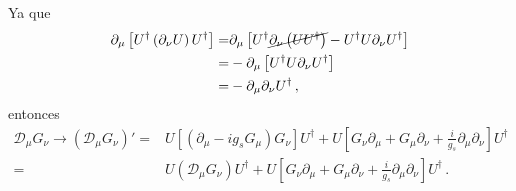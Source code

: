 Ya que
\begin{align}
 \partial_{\mu} \left[ {U}^{\dagger}
    \left( \partial_{\nu}{U} \right) {U}^{\dagger}\right]=&
 \partial_{\mu} \left[ {U}^{\dagger}
    \cancel{\partial_{\nu}\left( {U} {U}^{\dagger}\right)} -{U}^{\dagger}{U} \partial_{\nu} {U}^{\dagger}\right] \nonumber\\
=&- \partial_{\mu} \left[ {U}^{\dagger} {U} \partial_{\nu} {U}^{\dagger}\right] \nonumber\\
=&- \partial_{\mu}  \partial_{\nu} {U}^{\dagger} \,,
\end{align}
entonces
\begin{align}
\label{eq:Dmup}
\mathcal{D}_{\mu} {G}_{\nu}\to   \left(   \mathcal{D}_{\mu} {G}_{\nu} \right)' =& {U} \left[ \left( \partial_{\mu}-ig_s {G}_{\mu} \right){G}_\nu   \right]{U}^{\dagger}
    + {U} \left[ {G}_{\nu} \partial_{\mu}+{G}_{\mu}\partial_{\nu}+\frac{i}{g_s} \partial_{\mu}\partial_{\nu} \right] {U}^{\dagger} \nonumber\\
 =& {U} \left( \mathcal{D}_{\mu}{G}_\nu   \right){U}^{\dagger}
    + {U} \left[ {G}_{\nu} \partial_{\mu}+{G}_{\mu}\partial_{\nu}+\frac{i}{g_s} \partial_{\mu}\partial_{\nu} \right] {U}^{\dagger} \,.%
\end{align}


